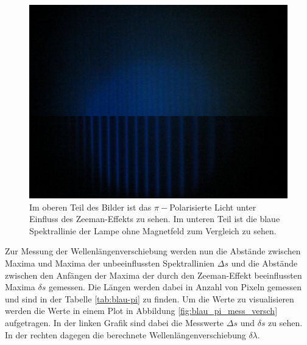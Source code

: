 \begin{figure}
    \centering
    \includegraphics[width=\textwidth]{content/data/Blau_0_pi_uebernander.JPG}
    \caption{Im oberen Teil des Bilder ist das $\pi -$Polarisierte Licht unter Einfluss des Zeeman-Effekts zu sehen. Im unteren Teil ist die blaue Spektrallinie der Lampe ohne Magnetfeld zum Vergleich zu sehen.}
    \label{fig:pi-blau}
\end{figure}

Zur Messung der Wellenlängenverschiebung werden nun die Abstände zwischen Maxima und Maxima der unbeeinflussten Spektrallinien $\Delta s$
und die Abstände zwischen den Anfängen der Maxima der durch den Zeeman-Effekt beeinflussten Maxima $\delta s$ gemessen.
Die Längen werden dabei in Anzahl von Pixeln gemessen und sind in der Tabelle \ref{tab:blau-pi} zu finden.
Um die Werte zu visualisieren werden die Werte in einem Plot in Abbildung \ref{fig:blau_pi_mess_versch} aufgetragen.
In der linken Grafik sind dabei die Messwerte $\Delta s$ und $\delta s$ zu sehen. In der rechten dagegen die berechnete Wellenlängenverschiebung $\delta \lambda$.

